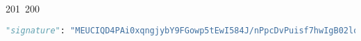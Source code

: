201~200~\documentclass{article}
\begin{document}
\begin{lstlisting}[language=Python, caption=Stored Message JSON]
	                                                                                                                                                                                                                                                                                                	                            "signature": "MEUCIQD4PAi0xqngjybY9FGowp5tEwI584J/nPpcDvPuisf7hwIgB02lo+de9wkW50XVAADd3bHM95zt4BBEElyW9zHfKFE=",
	                                                                                                                                                                                                                                                                                                	                                "timeBeforeUnlock": "2025-01-05T20:20:20"
	                                                                                                                                                                                                                                                                                                	                                }
	                                                                                                                                                                                                                                                                                                	                                \end{lstlisting}
\end{document}
